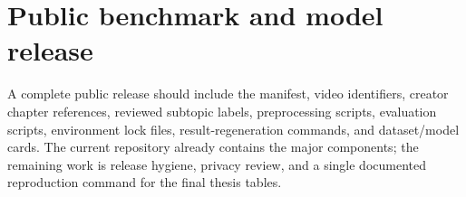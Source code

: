 \section{Public benchmark and model release}

A complete public release should include the manifest, video identifiers,
creator chapter references, reviewed subtopic labels, preprocessing scripts,
evaluation scripts, environment lock files, result-regeneration commands, and
dataset/model cards. The current repository already contains the major
components; the remaining work is release hygiene, privacy review, and a
single documented reproduction command for the final thesis tables.
